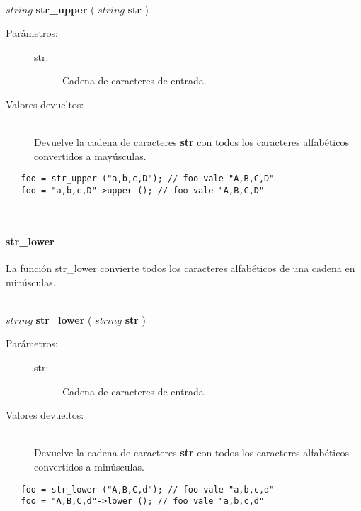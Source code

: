 \hfill \\ $string$ \textbf{str\_upper} ( $string$ \textbf{str} )  
\begin{description}
\item [Parámetros:] \hfill 
   \begin{description}
   \item[str:] Cadena de caracteres de entrada.
   \end{description}
\item[Valores devueltos:] \hfill \\
   Devuelve la cadena de caracteres \textbf{str} con todos los caracteres alfabéticos convertidos a mayúsculas.
\end{description}

\begin{lstlisting}
   foo = str_upper ("a,b,c,D"); // foo vale "A,B,C,D"
   foo = "a,b,c,D"->upper (); // foo vale "A,B,C,D" 
\end{lstlisting}
\hfill\\ 

\paragraph{str\_lower}
La función str\_lower convierte todos los caracteres alfabéticos de una cadena en minúsculas. 

\hfill \\ $string$ \textbf{str\_lower} ( $string$ \textbf{str} )  
\begin{description}
\item [Parámetros:] \hfill 
   \begin{description}
   \item[str:] Cadena de caracteres de entrada.
   \end{description}
\item[Valores devueltos:] \hfill \\
   Devuelve la cadena de caracteres \textbf{str} con todos los caracteres alfabéticos convertidos a minúsculas.
\end{description}

\begin{lstlisting}   
   foo = str_lower ("A,B,C,d"); // foo vale "a,b,c,d"
   foo = "A,B,C,d"->lower (); // foo vale "a,b,c,d" 
\end{lstlisting}
\hfill\\ 

